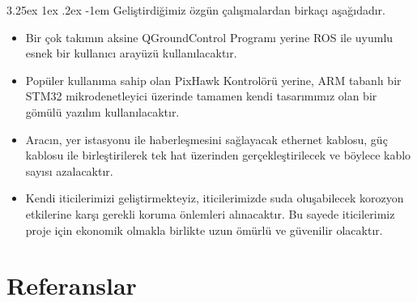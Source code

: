 \documentclass[12pt]{article}
\makeatletter
\renewcommand\paragraph{\@startsection{paragraph}{5}{\z@}%
  {3.25ex \@plus1ex \@minus.2ex}%
  {-1em}%
  {\normalfont\normalsize\bfseries}}
\makeatother
\begin{document}
\paragraph{} Geliştirdiğimiz özgün çalışmalardan birkaçı aşağıdadır.
\begin{itemize}
    \item Bir çok takımın aksine QGroundControl Programı yerine ROS ile uyumlu esnek bir kullanıcı arayüzü kullanılacaktır.
    
    \item Popüler kullanıma sahip olan PixHawk Kontrolörü yerine, ARM tabanlı bir STM32 mikrodenetleyici üzerinde tamamen kendi tasarımımız olan bir gömülü yazılım kullanılacaktır.
    \item Aracın, yer istasyonu ile haberleşmesini sağlayacak ethernet kablosu, güç kablosu ile birleştirilerek tek hat üzerinden gerçekleştirilecek ve böylece kablo sayısı azalacaktır.
    
    \item Kendi iticilerimizi geliştirmekteyiz, iticilerimizde suda oluşabilecek korozyon etkilerine karşı gerekli koruma önlemleri alınacaktır. Bu sayede iticilerimiz proje için ekonomik olmakla birlikte uzun ömürlü ve güvenilir olacaktır. 
\end{itemize}

\newpage
\section{Referanslar}
\vspace{-1cm}
\printbibliography[title={\textbf{ }}]
\end{document}
